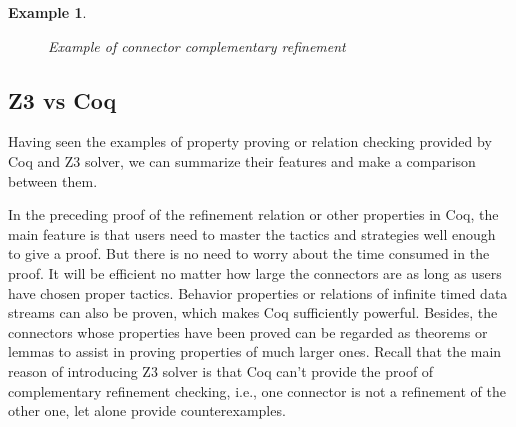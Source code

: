 \documentclass[preprint,3p]{elsarticle}
\newtheorem{example}{Example}[section]
\begin{document}
\begin{example}
\begin{figure}
\caption{Example of connector complementary refinement}
\label{fig:large}
\end{figure}
\end{example}
\subsection{Z3 vs Coq}
Having seen the examples of property proving or relation checking provided by Coq and Z3 solver, we can summarize their features and make a comparison between them.

In the preceding proof of the refinement relation or other properties in Coq, the main feature is that users need to master the tactics and strategies well enough to give a proof. But there is no need to worry about the time consumed in the proof. It will be efficient no matter how large the connectors are as long as users have chosen proper tactics. Behavior properties or relations of infinite timed data streams can also be proven, which makes Coq sufficiently powerful. Besides, the connectors whose properties have been proved can be regarded as theorems or lemmas to assist in proving properties of much larger ones. Recall that the main reason of introducing Z3 solver is that Coq can't provide the proof of complementary refinement checking, i.e., one connector is not a refinement of the other one, let alone provide counterexamples.
\end{document}
